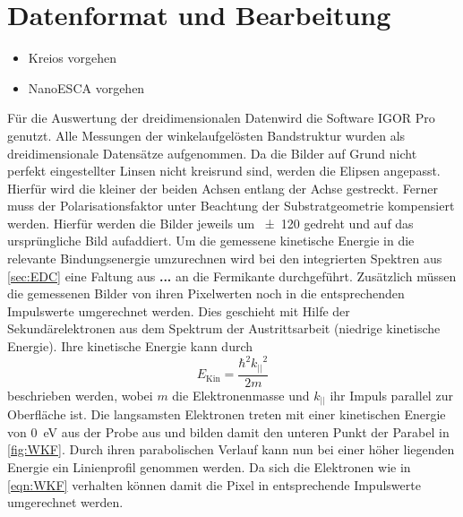     \section{Datenformat und Bearbeitung}
    \begin{itemize}
        \item Kreios vorgehen
        \item NanoESCA vorgehen
    \end{itemize}
        Für die Auswertung der dreidimensionalen Datenwird die Software IGOR Pro \cite{IGOR} genutzt.
        Alle Messungen der winkelaufgelösten Bandstruktur wurden als dreidimensionale Datensätze aufgenommen.
        Da die Bilder auf Grund nicht perfekt eingestellter Linsen nicht kreisrund sind, werden die Elipsen angepasst.
        Hierfür wird die kleiner der beiden Achsen entlang der Achse gestreckt.
        Ferner muss der Polarisationsfaktor unter Beachtung der Substratgeometrie kompensiert werden.
        Hierfür werden die Bilder jeweils um \SI{\pm120}{} gedreht und auf das ursprüngliche Bild aufaddiert.
        Um die gemessene kinetische Energie in die relevante Bindungsenergie umzurechnen wird bei den integrierten Spektren aus \autoref{sec:EDC} eine Faltung aus \textbf{...} an die Fermikante durchgeführt.
        Zusätzlich müssen die gemessenen Bilder von ihren Pixelwerten noch in die entsprechenden Impulswerte umgerechnet werden.
        Dies geschieht mit Hilfe der Sekundärelektronen aus dem Spektrum der Austrittsarbeit (niedrige kinetische Energie).
        Ihre kinetische Energie kann durch 
        \begin{equation}
            E_\text{Kin} = \frac{\hbar^2 {k_{||}}^2}{2 m}
            \label{eqn:WKF}
        \end{equation}
        beschrieben werden, wobei $m$ die Elektronenmasse und $k_{||}$ ihr Impuls parallel zur Oberfläche ist.
        Die langsamsten Elektronen treten mit einer kinetischen Energie von \SI{0}{\electronvolt} aus der Probe aus und bilden damit den unteren Punkt der Parabel in \autoref{fig:WKF}.
        Durch ihren parabolischen Verlauf kann nun bei einer höher liegenden Energie ein Linienprofil genommen werden.
        Da sich die Elektronen wie in \autoref{eqn:WKF} verhalten können damit die Pixel in entsprechende Impulswerte umgerechnet werden.


